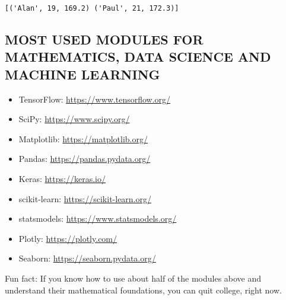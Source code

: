 \documentclass[11pt]{article}
\providecommand{\tightlist}{%
      \setlength{\itemsep}{0pt}\setlength{\parskip}{0pt}}
\begin{document}
    \begin{Verbatim}[commandchars=\\\{\}]
[('Alan', 19, 169.2) ('Paul', 21, 172.3)]
    \end{Verbatim}

    \hypertarget{most-used-modules-for-mathematics-data-science-and-machine-learning}{%
\subsection{MOST USED MODULES FOR MATHEMATICS, DATA SCIENCE AND MACHINE
LEARNING}\label{most-used-modules-for-mathematics-data-science-and-machine-learning}}

    \begin{itemize}
\tightlist
\item
  TensorFlow: \url{https://www.tensorflow.org/}
\item
  SciPy: \url{https://www.scipy.org/}
\item
  Matplotlib: \url{https://matplotlib.org/}
\item
  Pandas: \url{https://pandas.pydata.org/}
\item
  Keras: \url{https://keras.io/}
\item
  scikit-learn: \url{https://scikit-learn.org/}
\item
  statsmodels: \url{https://www.statsmodels.org/}
\item
  Plotly: \url{https://plotly.com/}
\item
  Seaborn: \url{https://seaborn.pydata.org/}
\end{itemize}

Fun fact: If you know how to use about half of the modules above and
understand their mathematical foundations, you can quit college, right
now.


    
    
    
\end{document}
